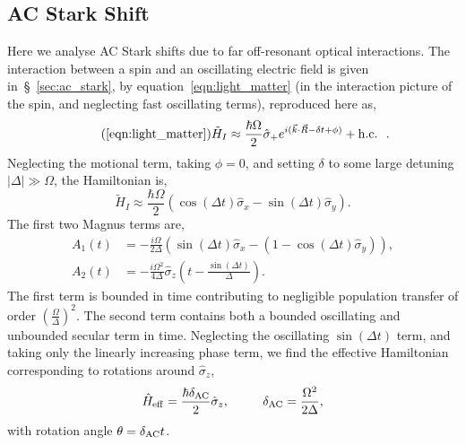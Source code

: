 \subsection{AC Stark Shift}
\label{app:stark_shift}
    Here we analyse AC Stark shifts due to far off-resonant optical interactions. The interaction between a spin and an oscillating electric field is given in~\S~\ref{sec:ac_stark}, by equation~\ref{eqn:light_matter} (in the interaction picture of the spin, and neglecting fast oscillating terms), reproduced here as,
    \begin{equation}
        \tag{\ref{eqn:light_matter}}
        \tilde H_I \approx \frac{\hbar\Omega}{2}\hat\sigma_+ e^{i(\vec k\cdot \vec R - \delta t + \phi)} + {\rm h.c.}~~.
    \end{equation}
    Neglecting the motional term, taking $\phi=0$, and setting $\delta$ to some large detuning $|\Delta| \gg \Omega$, the Hamiltonian is,
    \begin{equation}
        \tilde H_I \approx \frac{\hbar\Omega}{2}\left(\cos(\Delta t)\hat\sigma_x -  \sin(\Delta t)\hat\sigma_y\right).
    \end{equation}
    The first two Magnus terms are,
    \begin{subequations}
    \begin{align}
        A_1(t) &= -\frac{i\Omega}{2\Delta}\left(\sin(\Delta t)\hat\sigma_x - (1-\cos(\Delta t)\hat\sigma_y)\right),\\
        A_2(t) &= -\frac{i\Omega^2}{4\Delta}\hat\sigma_z\left(t-\frac{\sin(\Delta t)}{\Delta}\right).
    \end{align}
\end{subequations}
    The first term is bounded in time contributing to negligible population transfer of order $\left(\frac{\Omega}{\Delta}\right)^2$. The second term contains both a bounded oscillating and unbounded secular term in time. Neglecting the oscillating $\sin(\Delta t)$ term, and taking only the linearly increasing phase term, we find the effective Hamiltonian corresponding to rotations around $\hat\sigma_z$,
    \begin{equation}
        \hat H_{\rm eff} = \frac{\hbar\delta_{\rm AC}}{2}\hat\sigma_z, ~~~~~~~~ \delta_{\rm AC} = \frac{\Omega^2}{2\Delta},
    \end{equation}
    with rotation angle $\theta = \delta_{\rm AC}t$.


